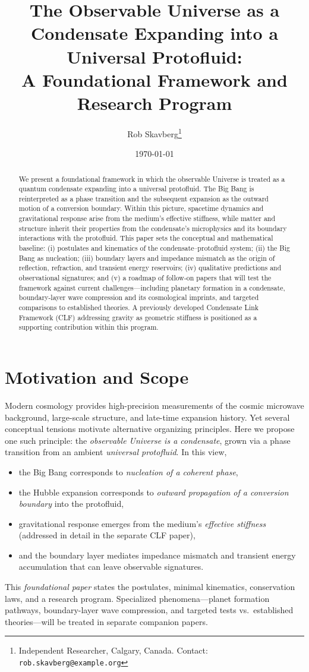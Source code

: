 \documentclass[11pt,a4paper]{article}
\title{\textbf{The Observable Universe as a Condensate Expanding into a Universal Protofluid:\\
A Foundational Framework and Research Program}}
\author{Rob Skavberg\thanks{Independent Researcher, Calgary, Canada. Contact: \texttt{rob.skavberg@example.org}}}
\date{\today}
\begin{document}
\maketitle
\doublespacing

\begin{abstract}
We present a foundational framework in which the observable Universe is treated as a quantum condensate expanding into a universal protofluid. The Big Bang is reinterpreted as a phase transition and the subsequent expansion as the outward motion of a conversion boundary. Within this picture, spacetime dynamics and gravitational response arise from the medium's effective stiffness, while matter and structure inherit their properties from the condensate's microphysics and its boundary interactions with the protofluid. This paper sets the conceptual and mathematical baseline: (i) postulates and kinematics of the condensate--protofluid system; (ii) the Big Bang as nucleation; (iii) boundary layers and impedance mismatch as the origin of reflection, refraction, and transient energy reservoirs; (iv) qualitative predictions and observational signatures; and (v) a roadmap of follow-on papers that will test the framework against current challenges---including planetary formation in a condensate, boundary-layer wave compression and its cosmological imprints, and targeted comparisons to established theories. A previously developed Condensate Link Framework (CLF) addressing gravity as geometric stiffness is positioned as a supporting contribution within this program.
\end{abstract}

\section{Motivation and Scope}
Modern cosmology provides high-precision measurements of the cosmic microwave background, large-scale structure, and late-time expansion history. Yet several conceptual tensions motivate alternative organizing principles. Here we propose one such principle: the \emph{observable Universe is a condensate}, grown via a phase transition from an ambient \emph{universal protofluid}. In this view,
\begin{itemize}
    \item the Big Bang corresponds to \emph{nucleation of a coherent phase}, 
    \item the Hubble expansion corresponds to \emph{outward propagation of a conversion boundary} into the protofluid,
    \item gravitational response emerges from the medium's \emph{effective stiffness} (addressed in detail in the separate CLF paper),
    \item and the boundary layer mediates impedance mismatch and transient energy accumulation that can leave observable signatures.
\end{itemize}
This \emph{foundational paper} states the postulates, minimal kinematics, conservation laws, and a research program. Specialized phenomena---planet formation pathways, boundary-layer wave compression, and targeted tests vs.\ established theories---will be treated in separate companion papers.
\end{document}
